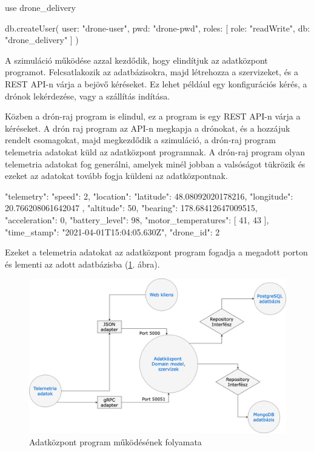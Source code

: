 \begin{python}
    use drone_delivery
\end{python}

\begin{python}

    db.createUser(
        {
        user: "drone-user",
        pwd: "drone-pwd",
        roles: [
            {
            role: "readWrite",
            db: "drone_delivery"
        }
        ]
    }
    )
\end{python}


A szimuláció működése azzal kezdődik, hogy elindítjuk az adatközpont programot.
Felcsatlakozik az adatbázisokra, majd létrehozza a szervizeket, és a REST API-n várja a bejövő kéréseket.
Ez lehet például egy konfigurációs kérés, a drónok lekérdezése, vagy a szállítás indítása.

Közben a drón-raj program is elindul, ez a program is egy REST API-n várja a kéréseket.
A drón raj program az API-n megkapja a drónokat, és a hozzájuk rendelt csomagokat, majd megkezdődik a szimuláció, a drón-raj program telemetria adatokat küld az adatközpont programnak.
A drón-raj program olyan telemetria adatokat fog generálni, amelyek minél jobban a valsóságot tükrözik és ezeket az adatokat tovább fogja küldeni az adatközpontnak.
\begin{python}
{
    "telemetry": {
    "speed": 2,
    "location": {
        "latitude": 48.08092020178216,
        "longitude": 20.766208061642047
    },
    "altitude": 50,
    "bearing": 178.68412647009515,
    "acceleration": 0,
    "battery_level": 98,
    "motor_temperatures": [
    41,
    43
    ],
    "time_stamp": "2021-04-01T15:04:05.630Z",
    "drone_id": 2
}
}
\end{python}

Ezeket a telemetria adatokat az adatközpont program fogadja a megadott porton és lementi az adott adatbázisba (\ref{fig:adatkozpont-flow}. ábra).

\begin{figure}[h]
    \centering
    \includegraphics[scale=0.3]{images/adatkozpont-flow.png}
    \caption{Adatközpont program működésének folyamata}
    \label{fig:adatkozpont-flow}
\end{figure}

